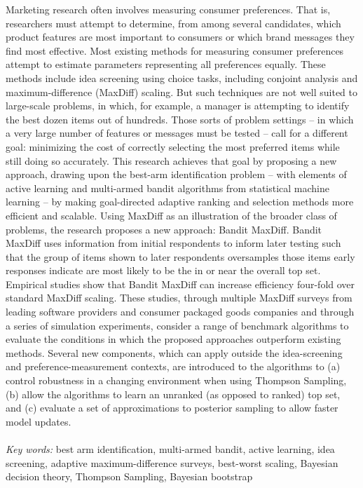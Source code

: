 \documentclass[blindrev]{informs3} %
\begin{document}
\SingleSpacedXI
Marketing research often involves measuring consumer preferences.  That is, researchers must attempt to determine, from among several candidates, which product features are most important to consumers or which brand messages they find most effective.  Most existing methods for measuring consumer preferences attempt to estimate parameters representing all preferences equally.  These methods include idea screening using choice tasks, including conjoint analysis and maximum-difference (MaxDiff) scaling.  But such techniques are not well suited to large-scale problems, in which, for example, a manager is attempting to identify the best dozen items out of hundreds. Those sorts of problem settings -- in which a very large number of features or messages must be tested -- call for a different goal: minimizing the cost of correctly selecting the most preferred items while still doing so accurately. This research achieves that goal by proposing a new approach, drawing upon the best-arm identification problem -- with elements of active learning and multi-armed bandit algorithms from statistical machine learning -- by making goal-directed adaptive ranking and selection methods more efficient and scalable. Using MaxDiff as an illustration of the broader class of problems, the research proposes a new approach: Bandit MaxDiff.  Bandit MaxDiff uses information from initial respondents to inform later testing such that the group of items shown to later respondents oversamples those items early responses indicate are most likely to be the in or near the overall top set. Empirical studies show that Bandit MaxDiff can increase efficiency four-fold over standard MaxDiff scaling. These studies, through multiple MaxDiff surveys from leading software providers and consumer packaged goods companies and through a series of simulation experiments, consider a range of benchmark algorithms to evaluate the conditions in which the proposed approaches outperform existing methods. Several new components, which can apply outside the idea-screening and preference-measurement contexts, are introduced to the algorithms to (a) control robustness in a changing environment when using Thompson Sampling, (b) allow the algorithms to learn an unranked (as opposed to ranked) top set, and (c) evaluate a set of approximations to posterior sampling to allow faster model updates.
~ \\
~ \\
\emph{Key words:}
best arm identification, multi-armed bandit, active learning, idea screening, adaptive maximum-difference surveys, best-worst scaling, Bayesian decision theory, Thompson Sampling, Bayesian bootstrap
\end{document}
